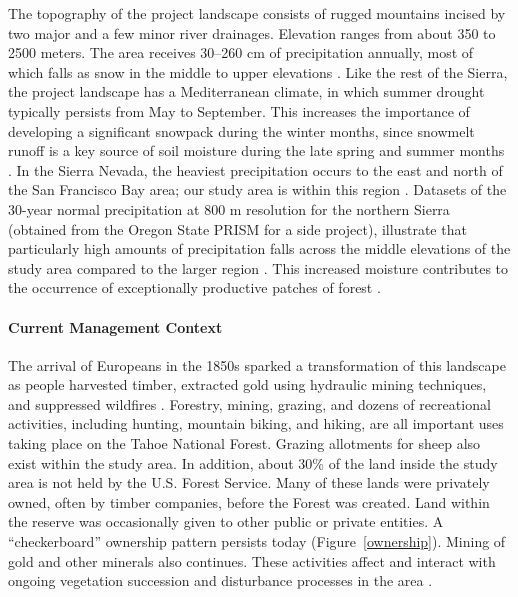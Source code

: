 The topography of the project landscape consists of rugged mountains incised by two major and a few minor river drainages. Elevation ranges from about 350 to 2500 meters. The area receives 30--260 cm of precipitation annually, most of which falls as snow in the middle to upper elevations \citep{Storer1963}. Like the rest of the Sierra, the project landscape has a Mediterranean climate, in which summer drought typically persists from May to September. This increases the importance of developing a significant snowpack during the winter months, since snowmelt runoff is a key source of soil moisture during the late spring and summer months \citep{Minnich2007,Skinner1996}. In the Sierra Nevada, the heaviest precipitation occurs to the east and north of the San Francisco Bay area; our study area is within this region \citep{VanWag2006}. Datasets of the 30-year normal precipitation at 800 m resolution for the northern Sierra (obtained from the Oregon State PRISM for a side project), illustrate that particularly high amounts of precipitation falls across the middle elevations of the study area compared to the larger region \citep{PRISMClimateGroup2004}. This increased moisture contributes to the occurrence of exceptionally productive patches of forest \citep[][ Alan Doerr, personal communication]{Littell2012}.





\paragraph{Current Management Context}

The arrival of Europeans in the 1850s sparked a transformation of this landscape as people harvested timber, extracted gold using hydraulic mining techniques, and suppressed wildfires \citep{Storer1963}. Forestry, mining, grazing, and dozens of recreational activities, including hunting, mountain biking, and hiking, are all important uses taking place on the Tahoe National Forest. Grazing allotments for sheep also exist within the study area. In addition, 
about 30\% of the land inside the study area is not held by the U.S. Forest Service. Many of these lands were privately owned, often by timber companies, before the Forest was created. Land within the reserve was occasionally given to other public or private entities. A ``checkerboard'' ownership pattern persists today (Figure~\ref{ownership}). Mining of gold and other minerals also continues. These activities affect and interact with ongoing vegetation succession and disturbance processes in the area \citep{USDAForestService2014}.

